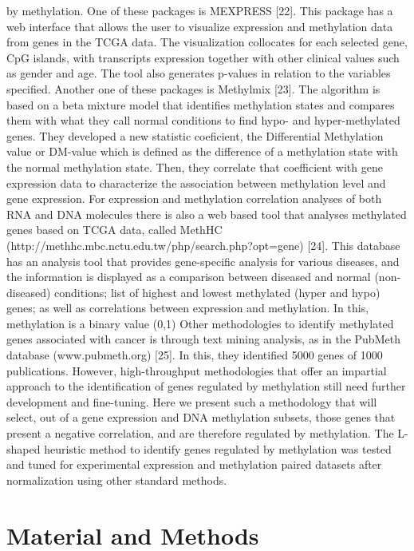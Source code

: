 \documentclass[10pt,letterpaper]{article}
\begin{document}
by methylation. One of these packages is MEXPRESS {[}22{]}.
This package has a web interface that allows the user to visualize
expression and methylation data from genes in the TCGA data. The
visualization collocates for each selected gene, CpG islands, with
transcripts expression together with other clinical values such as
gender and age. The tool also generates p-values in relation to the
variables specified. Another one of these packages is Methylmix {[}23{]}.
The algorithm is based on a beta mixture model that identifies
methylation states and compares them with what they call normal
conditions to find hypo- and hyper-methylated genes. They developed a
new statistic coeficient, the Differential Methylation value or DM-value
which is defined as the difference of a methylation state with the
normal methylation state. Then, they correlate that coefficient with
gene expression data to characterize the association between methylation
level and gene expression. For expression and methylation correlation
analyses of both RNA and DNA molecules there is also a web based tool
that analyses methylated genes based on TCGA data, called MethHC
(http://methhc.mbc.nctu.edu.tw/php/search.php?opt=gene) {[}24{]}. This database
has an analysis tool that provides gene-specific analysis for various diseases, 
and the information is displayed as a comparison between diseased and normal 
(non-diseased) conditions; list of highest and lowest methylated 
(hyper and hypo) genes; as well as correlations between expression and 
methylation. In this, methylation is a binary value (0,1) Other methodologies 
to identify methylated genes associated with cancer is through text mining 
analysis, as in the PubMeth database (www.pubmeth.org) {[}25{]}. In this, they 
identified 5000 genes of 1000 publications. However, high-throughput 
methodologies that offer an impartial approach to the identification of genes
regulated by methylation still need further development and fine-tuning.
Here we present such a methodology that will select, out of a gene
expression and DNA methylation subsets, those genes that present a
negative correlation, and are therefore regulated by methylation. The
L-shaped heuristic method to identify genes regulated by methylation was
tested and tuned for experimental expression and methylation paired
datasets after normalization using other standard methods.

\hypertarget{material-and-methods}{%
\section{Material and Methods}\label{material-and-methods}}
\end{document}

